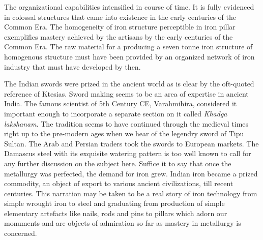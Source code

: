 The organizational capabilities intensified in course of time. It is fully evidenced in colossal structures that came into existence in the early centuries of the Common Era. The homogeneity of iron structure perceptible in iron pillar exemplifies mastery achieved by the artisans by the early centuries of the Common Era. The raw material for a producing a seven tonne iron structure of homogenous structure must have been provided by an organized network of iron industry that must have developed by then.

The Indian swords were prized in the ancient world as is clear by the oft-quoted reference of Ktesias. Sword making seems to be an area of expertise in ancient India. The famous scientist of 5th Century CE, Varahmihira, considered it important enough to incorporate a separate section on it called \textit{Khadga lakshanam}. The tradition seems to have continued through the medieval times right up to the pre-modern ages when we hear of the legendry sword of Tipu Sultan. The Arab and Persian traders took the swords to European markets. The Damascus steel with its exquisite watering pattern is too well known to call for any further discussion on the subject here. Suffice it to say that once the metallurgy was perfected, the demand for iron grew. Indian iron became a prized commodity, an object of export to various ancient civilizations, till recent centuries. This narration may be taken to be a real story of iron technology from simple wrought iron to steel and graduating from production of simple elementary artefacts like nails, rods and pins to pillars which adorn our monuments and are objects of admiration so far as mastery in metallurgy is concerned.

